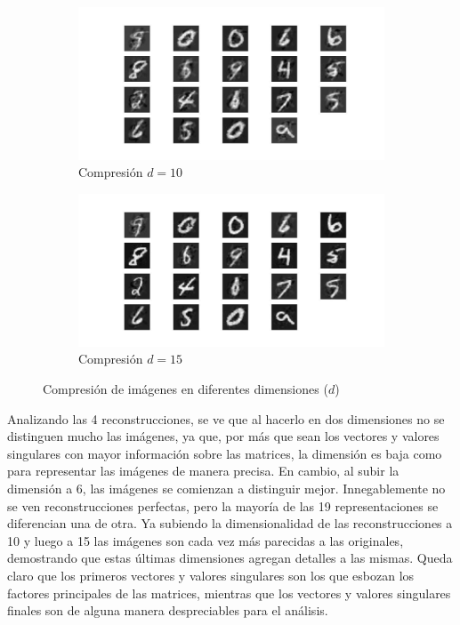 \documentclass[12pt,a4]{article} %
\begin{document}
\begin{figure}[H]
\begin{subfigure}{0.45\textwidth}
        \label{fig:d6}
    \end{subfigure}
    \\
    \begin{subfigure}{0.45\textwidth}
        \includegraphics[width=\linewidth]{latex_project/Graficos_ej2/compression_10.jpeg}
        \caption{Compresión $d = 10$}
        \label{fig:d10}
    \end{subfigure}
    \hfill
    \begin{subfigure}{0.45\textwidth}
        \includegraphics[width=\linewidth]{latex_project/Graficos_ej2/compression_15.jpeg}
        \caption{Compresión $d = 15$}
        \label{fig:d15}
    \end{subfigure}
    \caption{Compresión de imágenes en diferentes dimensiones ($d$)}
    \label{fig:compresiones}
\end{figure}

Analizando las 4 reconstrucciones, se ve que al hacerlo en dos dimensiones no se distinguen mucho las imágenes, ya que, por más que sean los vectores y valores singulares con mayor información sobre las matrices, la dimensión es baja como para representar las imágenes de manera precisa. En cambio, al subir la dimensión a 6, las imágenes se comienzan a distinguir mejor. Innegablemente no se ven reconstrucciones perfectas, pero la mayoría de las 19 representaciones se diferencian una de otra. Ya subiendo la dimensionalidad de las reconstrucciones a 10 y luego a 15 las imágenes son cada vez más parecidas a las originales, demostrando que estas últimas dimensiones agregan detalles a las mismas. Queda claro que los primeros vectores y valores singulares son los que esbozan los factores principales de las matrices, mientras que los vectores y valores singulares finales son de alguna manera despreciables para el análisis.
\\
\end{document}
